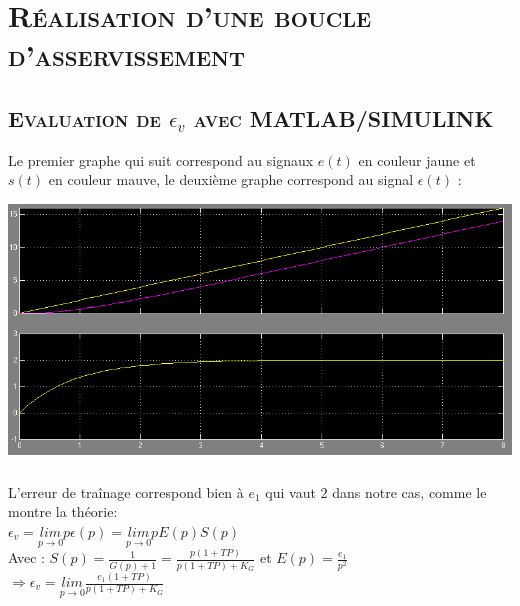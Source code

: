 \chapter{\textsc{Réalisation d'une boucle d'asservissement }}
\section{\textsc{Evaluation de $\epsilon_v$ avec MATLAB/SIMULINK}}
	
	\par Le premier graphe qui suit correspond au signaux $e(t)$ en couleur jaune et $s(t)$ en couleur mauve, le deuxième graphe correspond au signal $ \epsilon(t)$  :\\
	\begin{center}
	\includegraphics[scale=0.5]{ev.png}
	\label{fig2} 
	\end{center} 
	

	\paragraph{} L'erreur de traînage correspond bien à $e_1$ qui vaut $2$ dans notre cas, comme le montre la théorie:\\
	$ \epsilon_v = \underset{p\rightarrow 0}{lim} p \epsilon(p) = \underset{p\rightarrow 0}{lim} p E(p)S(p)  $\\[0.25 cm] 
	Avec : $S(p) = \frac{1}{G(p)+1} =  \frac{p(1+TP)}{p(1+TP)+K_G}$ et $E(p) = \frac{e_1}{p^2}$\\[0.25cm]
	
	$\Rightarrow \epsilon_v = \underset{p\rightarrow 0}{lim}\frac{e_1(1+TP)}{p(1+TP)+K_G}$\\[0.25cm]
	   
